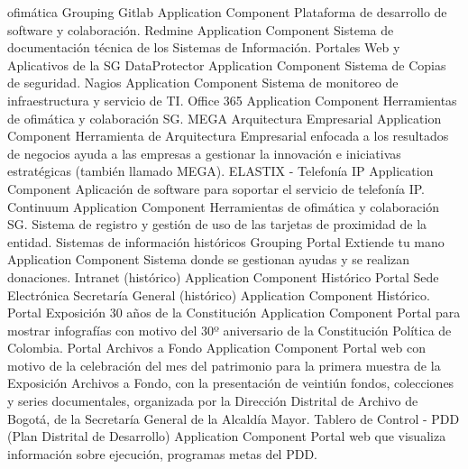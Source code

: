 \documentclass[
	a4paper, %
	12pt, %
]{include/CSSullivanBusinessReport}
\begin{document}
ofimática \textbar{} Grouping \textbar{} \textbar{} \textbar{} Gitlab
\textbar{} Application Component \textbar{} Plataforma de desarrollo de
software y colaboración. \textbar{} \textbar{} Redmine \textbar{}
Application Component \textbar{} Sistema de documentación técnica de los
Sistemas de Información. Portales Web y Aplicativos de la SG \textbar{}
\textbar{} DataProtector \textbar{} Application Component \textbar{}
Sistema de Copias de seguridad. \textbar{} \textbar{} Nagios \textbar{}
Application Component \textbar{} Sistema de monitoreo de infraestructura
y servicio de TI. \textbar{} \textbar{} Office 365 \textbar{}
Application Component \textbar{} Herramientas de ofimática y
colaboración SG. \textbar{} \textbar{} MEGA Arquitectura Empresarial
\textbar{} Application Component \textbar{} Herramienta de Arquitectura
Empresarial enfocada a los resultados de negocios ayuda a las empresas a
gestionar la innovación e iniciativas estratégicas (también llamado
MEGA). \textbar{} \textbar{} ELASTIX - Telefonía IP \textbar{}
Application Component \textbar{} Aplicación de software para soportar el
servicio de telefonía IP. \textbar{} \textbar{} Continuum \textbar{}
Application Component \textbar{} Herramientas de ofimática y
colaboración SG. Sistema de registro y gestión de uso de las tarjetas de
proximidad de la entidad. \textbar{} \textbar{} Sistemas de información
históricos \textbar{} Grouping \textbar{} \textbar{} \textbar{} Portal
Extiende tu mano \textbar{} Application Component \textbar{} Sistema
donde se gestionan ayudas y se realizan donaciones. \textbar{}
\textbar{} Intranet (histórico) \textbar{} Application Component
\textbar{} Histórico \textbar{} \textbar{} Portal Sede Electrónica
Secretaría General (histórico) \textbar{} Application Component
\textbar{} Histórico. \textbar{} \textbar{} Portal Exposición 30 años de
la Constitución \textbar{} Application Component \textbar{} Portal para
mostrar infografías con motivo del 30º aniversario de la Constitución
Política de Colombia. \textbar{} \textbar{} Portal Archivos a Fondo
\textbar{} Application Component \textbar{} Portal web con motivo de la
celebración del mes del patrimonio para la primera muestra de la
Exposición Archivos a Fondo, con la presentación de veintiún fondos,
colecciones y series documentales, organizada por la Dirección Distrital
de Archivo de Bogotá, de la Secretaría General de la Alcaldía Mayor.
\textbar{} \textbar{} Tablero de Control - PDD (Plan Distrital de
Desarrollo) \textbar{} Application Component \textbar{} Portal web que
visualiza información sobre ejecución, programas metas del PDD.
\end{document}
